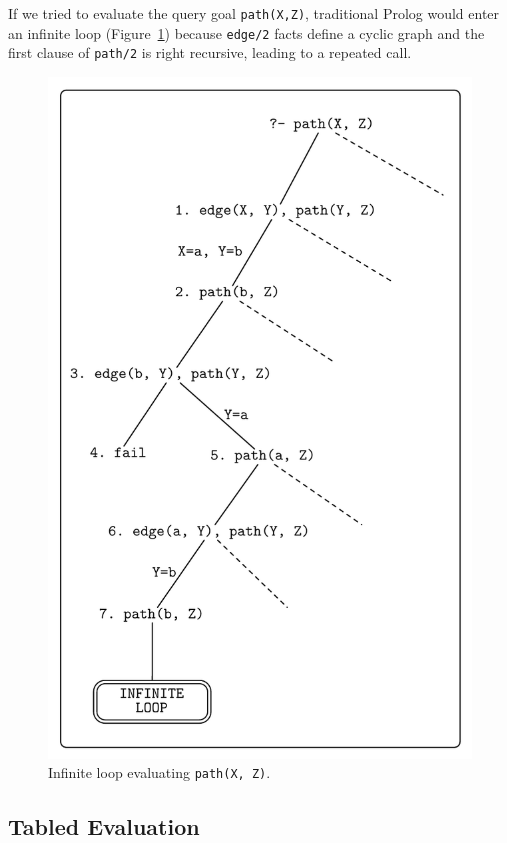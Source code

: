 If we tried to evaluate the query goal \texttt{path(X,Z)}, traditional Prolog would enter an infinite
loop (Figure~\ref{fig:infinite_loop}) because \texttt{edge/2} facts define a cyclic graph and the first
clause of \texttt{path/2} is right recursive, leading to a repeated call.

\begin{figure}[ht]
  \centering
    \includegraphics[scale=0.6]{infinite_loop.pdf}
  \caption{Infinite loop evaluating \texttt{path(X, Z)}.}
  \label{fig:infinite_loop}
\end{figure}

\subsection{Tabled Evaluation}


